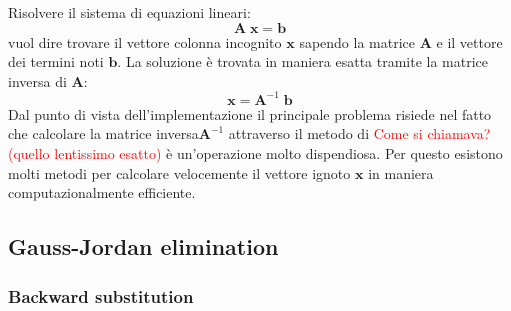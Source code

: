 \documentclass[10pt]{article}
\begin{document}
Risolvere il sistema di equazioni lineari:
\begin{equation}
\mathbf{A} \; \mathbf{x} = \mathbf{b}
\label{eq:lin_sys}
\end{equation}
vuol dire trovare il vettore colonna incognito $\mathbf{x}$ sapendo la matrice $\mathbf{A}$ e il vettore dei termini noti $\mathbf{b}$. La soluzione è trovata in maniera esatta tramite la matrice inversa di $\mathbf{A}$:
\begin{equation}
\mathbf{x} = \mathbf{A}^{-1} \; \mathbf{b}
\end{equation}
Dal punto di vista dell'implementazione il principale problema risiede nel fatto che calcolare la matrice inversa$\mathbf{A}^{-1}$ attraverso il metodo di \textcolor{red}{Come si chiamava? (quello lentissimo esatto)} è un'operazione molto dispendiosa.
Per questo esistono molti metodi per calcolare velocemente il vettore ignoto $\mathbf{x}$ in maniera computazionalmente efficiente.



\subsection{Gauss-Jordan elimination}


\subsubsection{Backward substitution}
\end{document}
